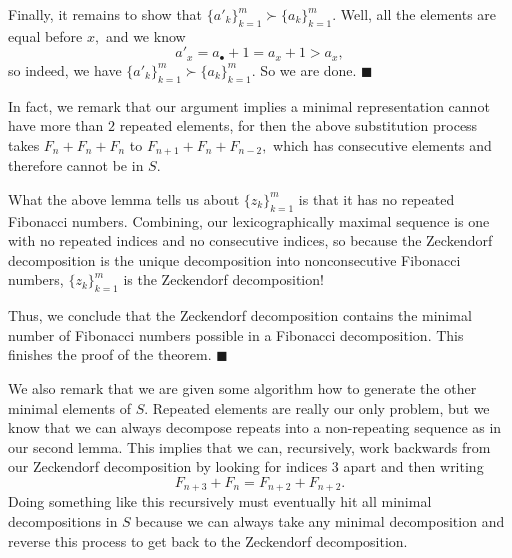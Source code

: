 Finally, it remains to show that $\{a'_k\}_{k=1}^m\succ\{a_k\}_{k=1}^m.$ Well, all the elements are equal before $x,$ and we know
\[a'_x=a_\bullet+1=a_x+1>a_x,\]
so indeed, we have $\{a'_k\}_{k=1}^m\succ\{a_k\}_{k=1}^m.$ So we are done. $\blacksquare$

In fact, we remark that our argument implies a minimal representation cannot have more than $2$ repeated elements, for then the above substitution process takes $F_n+F_n+F_n$ to $F_{n+1}+F_n+F_{n-2},$ which has consecutive elements and therefore cannot be in $S.$

What the above lemma tells us about $\{z_k\}_{k=1}^m$ is that it has no repeated Fibonacci numbers. Combining, our lexicographically maximal sequence is one with no repeated indices and no consecutive indices, so because the Zeckendorf decomposition is the unique decomposition into nonconsecutive Fibonacci numbers, $\{z_k\}_{k=1}^m$ is the Zeckendorf decomposition!

Thus, we conclude that the Zeckendorf decomposition contains the minimal number of Fibonacci numbers possible in a Fibonacci decomposition. This finishes the proof of the theorem. $\blacksquare$

We also remark that we are given some algorithm how to generate the other minimal elements of $S.$ Repeated elements are really our only problem, but we know that we can always decompose repeats into a non-repeating sequence as in our second lemma. This implies that we can, recursively, work backwards from our Zeckendorf decomposition by looking for indices $3$ apart and then writing
\[F_{n+3}+F_n=F_{n+2}+F_{n+2}.\]
Doing something like this recursively must eventually hit all minimal decompositions in $S$ because we can always take any minimal decomposition and reverse this process to get back to the Zeckendorf decomposition.